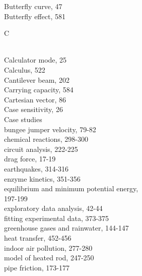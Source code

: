 \documentclass[../main.tex]{subfiles}
\begin{document}
\begin{multicols}{3}
    Butterfly curve, 47\\
    Butterfly effect, 581\vspace*{2mm}\\
    \begin{huge} C \end{huge}\\
    Calculator mode, 25\\
    Calculus, 522\\
    Cantilever beam, 202\\
    Carrying capacity, 584\\
    Cartesian vector, 86\\
    Case sensitivity, 26\\
    Case studies\\
    \hspace*{3mm}bungee jumper velocity, 79-82\\
    \hspace*{3mm}chemical reactions, 298-300\\
    \hspace*{3mm}circuit analysis, 222-225\\
    \hspace*{3mm}drag force, 17-19\\
    \hspace*{3mm}earthquakes, 314-316\\
    \hspace*{3mm}enzyme kinetics, 351-356\\
    \hspace*{3mm}equilibrium and minimum potential energy,\\
    \hspace*{3mm}197-199\\
    \hspace*{3mm}exploratory data analysis, 42-44\\
    \hspace*{3mm}fitting experimental data, 373-375\\
    \hspace*{3mm}greenhouse gases and rainwater, 144-147\\
    \hspace*{3mm}heat transfer, 452-456\\
    \hspace*{3mm}indoor air pollution, 277-280\\
    \hspace*{3mm}model of heated rod, 247-250\\
    \hspace*{3mm}pipe friction, 173-177\\

\end{multicols}
\end{document}
